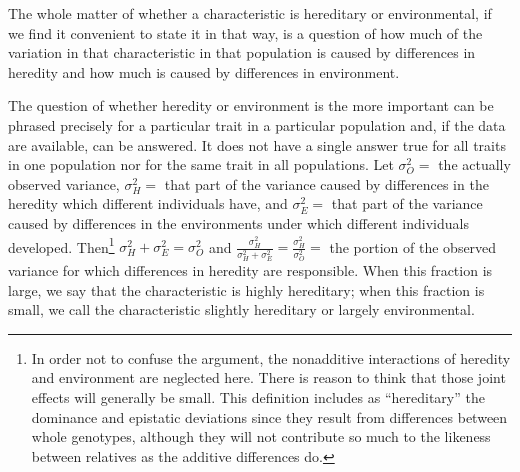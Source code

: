 The whole matter of whether a characteristic is hereditary or environmental,
if we find it convenient to state it in that way, is a question
of how much of the variation in that characteristic in that population is
caused by differences in heredity and how much is caused by differences
in environment.

The question of whether heredity or environment is the more
important can be phrased precisely for a particular trait in a particular
population and, if the data are available, can be answered. It does not
have a single answer true for all traits in one population nor for the
same trait in all populations. Let $\sigma_O^2 =$ the actually observed variance,
$\sigma_H^2 =$ that part of the variance caused by differences in the heredity
which different individuals have, and $\sigma_E^2 =$ that part of the variance
caused by differences in the environments under which different individuals
developed. Then\footnote{In order not to confuse the argument, the nonadditive
interactions of heredity and environment are neglected here. There is reason to
think that those joint effects will generally be small. This definition includes
as ``hereditary'' the dominance and epistatic deviations since they result from
differences between whole genotypes, although they will not contribute so much to
the likeness between relatives as the additive differences do.} $\sigma_H^2 +
\sigma_E^2 = \sigma_O^2$ and $\frac{\sigma_H^2}{\sigma_H^2 + \sigma_E^2} =
\frac{\sigma_H^2}{\sigma_O^2} =$ the portion of the observed variance for which
differences in heredity are responsible. When this fraction is large, we say
that the characteristic is highly hereditary; when this fraction is small, we
call the characteristic slightly hereditary or largely environmental.

